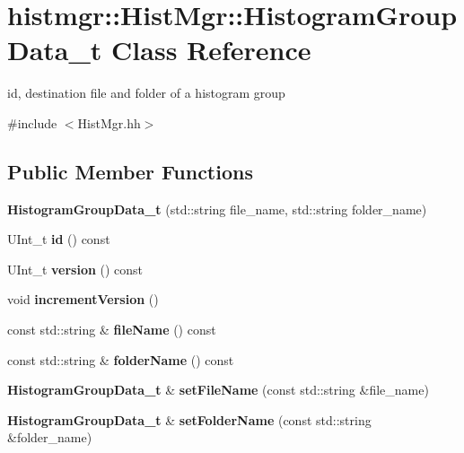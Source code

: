 \section{histmgr::HistMgr::HistogramGroupData\_\-t Class Reference}
\label{classhistmgr_1_1HistMgr_1_1HistogramGroupData__t}


id, destination file and folder of a histogram group  


{\ttfamily \#include $<$HistMgr.hh$>$}\subsection*{Public Member Functions}
\begin{DoxyCompactItemize}
\item 
{\bfseries HistogramGroupData\_\-t} (std::string file\_\-name, std::string folder\_\-name)\label{classhistmgr_1_1HistMgr_1_1HistogramGroupData__t_a07a5f211a1b240c9834f69c67b4f6203}

\item 
UInt\_\-t {\bfseries id} () const \label{classhistmgr_1_1HistMgr_1_1HistogramGroupData__t_a30189a30c3e48bf0f70779642a4e0b6d}

\item 
UInt\_\-t {\bfseries version} () const \label{classhistmgr_1_1HistMgr_1_1HistogramGroupData__t_a53a43a01a611eeb58986d06cf112baaf}

\item 
void {\bfseries incrementVersion} ()\label{classhistmgr_1_1HistMgr_1_1HistogramGroupData__t_a523ffb8dee6ceb8c802d7582d65d8a0f}

\item 
const std::string \& {\bfseries fileName} () const \label{classhistmgr_1_1HistMgr_1_1HistogramGroupData__t_acd20c1c6b5e1204649f0d7603b0f6ee2}

\item 
const std::string \& {\bfseries folderName} () const \label{classhistmgr_1_1HistMgr_1_1HistogramGroupData__t_a886cab942d93e6ba0485ed6eb82afd02}

\item 
{\bf HistogramGroupData\_\-t} \& {\bfseries setFileName} (const std::string \&file\_\-name)\label{classhistmgr_1_1HistMgr_1_1HistogramGroupData__t_a4d9c6b374964d3def4ac44f60596143d}

\item 
{\bf HistogramGroupData\_\-t} \& {\bfseries setFolderName} (const std::string \&folder\_\-name)\label{classhistmgr_1_1HistMgr_1_1HistogramGroupData__t_a74225cdfb078be31da16dfe9482d62bc}


\end{DoxyCompactItemize}
